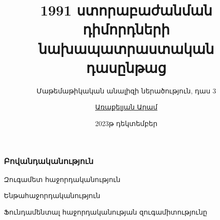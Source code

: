 \documentclass[aspectratio=169]{beamer} %
\title[մաթ․ անալիզ - դաս 3]{1991 ստորաբաժանման դիմորդների նախապատրաստական դասընթաց}
\subtitle{Մաթեմաթիկական անալիզի ներածություն, դաս 3}
\author[Առաքելյան Ա․]{
    \href{mailto:aram.arakeljan@gmail.com}{Առաքելյան Արամ}
}
\institute{\href{https://1991.mil.am/}{«1991» ակադեմիա}}
\date{2023թ դեկտեմբեր}
\begin{document}
    \begin{frame}
        \titlepage
    \end{frame}
    \begin{frame}
        \frametitle{Բովանդականություն}
        \begin{block}{}
            Զուգամետ հաջորդականություն
        \end{block}
        \begin{block}{}
            Ենթահաջորդականություն
        \end{block}
        \begin{block}{}
            Ֆունդամենտալ հաջորդականության զուգամիտությունը
        \end{block}

    \end{frame}
\end{document}
